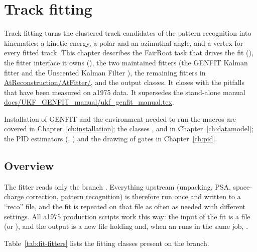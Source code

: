 \chapter{Track fitting}
\label{ch:fitting}

Track fitting turns the clustered track candidates of the pattern recognition into kinematics: a kinetic energy, a
polar and an azimuthal angle, and a vertex for every fitted track. This chapter describes the FairRoot task that drives
the fit (), the fitter interface it owns (), the two maintained fitters
(the GENFIT Kalman fitter  and the Unscented Kalman Filter ),
the remaining fitters in \url{AtReconstruction/AtFitter/}, and the output classes. It closes with the pitfalls that
have been measured on a1975 data. It supersedes the stand-alone manual
\url{docs/UKF_GENFIT_manual/ukf_genfit_manual.tex}.

Installation of GENFIT and the environment needed to run the macros are covered in Chapter~\ref{ch:installation}; the
classes ,  and  in Chapter~\ref{ch:datamodel}; the PID
estimators (, ) and the drawing of gates in Chapter~\ref{ch:pid}.

\section{Overview}
\label{sec:fit-overview}

The fitter reads only the branch . Everything upstream (unpacking, PSA, space-charge correction,
pattern recognition) is therefore run once and written to a ``reco'' file, and the fit is repeated on that file as
often as needed with different settings. All a1975 production scripts work this way: the input of the fit is a file
 (or ), and the output is a new file holding
 and, when an  runs in the same job, .

Table~\ref{tab:fit-fitters} lists the fitting classes present on the branch.

